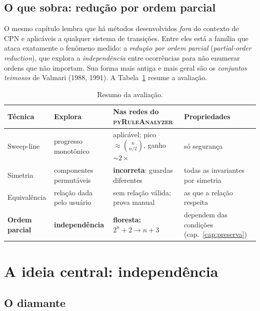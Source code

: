 \documentclass[11pt,a4paper]{report}
\newcommand{\pyra}{\textsc{pyRuleAnalyzer}}
\theoremstyle{definition}
\begin{document}
\section{O que sobra: redução por ordem parcial}

O mesmo capítulo lembra que há métodos desenvolvidos \emph{fora} do contexto de
CPN e aplicáveis a qualquer sistema de transições. Entre eles está a família
que ataca exatamente o fenômeno medido: a \emph{redução por ordem parcial}
(\emph{partial-order reduction}), que explora a \emph{independência} entre
ocorrências para não enumerar ordens que não importam. Sua forma mais antiga e
mais geral são os \emph{conjuntos teimosos} de Valmari (1988, 1991). A
Tabela~\ref{tab:comparacao} resume a avaliação.

\begin{table}[ht]
\centering\small
\begin{tabular}{>{\raggedright\arraybackslash}p{2.3cm}>{\raggedright\arraybackslash}p{3.0cm}>{\raggedright\arraybackslash}p{3.9cm}>{\raggedright\arraybackslash}p{3.2cm}}
\toprule
Técnica & Explora & Nas redes do \pyra{} & Propriedades \\
\midrule
Sweep-line & progresso monotônico & aplicável; pico $\approx\binom{n}{n/2}$, ganho $\sim2\times$ & só segurança \\
Simetria & componentes permutáveis & \textbf{incorreta}: guardas diferentes & todas as invariantes por simetria \\
Equivalência & relação dada pelo usuário & sem relação válida; prova manual & as que a relação respeita \\
\textbf{Ordem parcial} & \textbf{independência} & \textbf{floresta: $2^n+2 \to n+3$} & dependem das condições (cap.~\ref{cap:preserva}) \\
\bottomrule
\end{tabular}
\caption{Resumo da avaliação.}
\label{tab:comparacao}
\end{table}

\chapter{A ideia central: independência}
\label{cap:ideia}

\section{O diamante}
\end{document}
